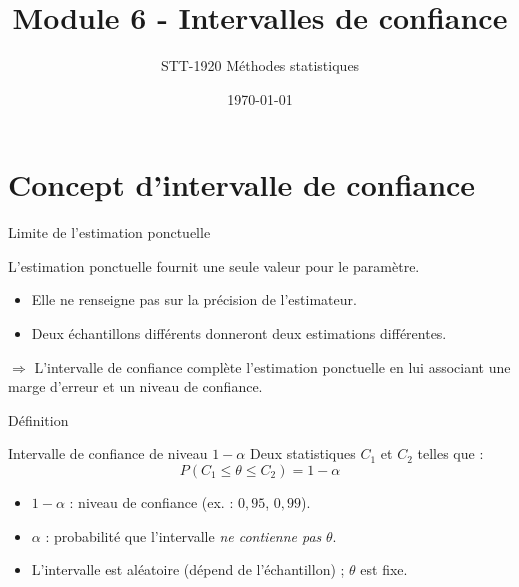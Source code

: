 \documentclass{BeamerTemplate}
\title{Module 6 - Intervalles de confiance}
\subtitle{STT-1920 Méthodes statistiques}
\date{\today}
\begin{document}
\begin{frame}[t]
  \titlepage
\end{frame}

\section{Concept d'intervalle de confiance}

\begin{frame}[t]{Limite de l'estimation ponctuelle}

L'estimation ponctuelle fournit \alert{une seule valeur} pour le paramètre.

\bigskip
\begin{itemize}\itemsep5mm
  \item Elle ne renseigne pas sur la \alert{précision} de l'estimateur.
  \item Deux échantillons différents donneront deux estimations différentes.
\end{itemize}

\bigskip
$\Rightarrow$ L'intervalle de confiance complète l'estimation ponctuelle en lui associant une \alert{marge d'erreur} et un \alert{niveau de confiance}.

\end{frame}

\begin{frame}[t]{Définition}

\begin{Boite}{Intervalle de confiance de niveau $1-\alpha$}
Deux statistiques $C_1$ et $C_2$ telles que :
$$P(C_1 \le \theta \le C_2) = 1 - \alpha$$
\end{Boite}

\medskip
\begin{itemize}\itemsep5mm
  \item $1-\alpha$ : \alert{niveau de confiance} (ex. : $0{,}95$, $0{,}99$).
  \item $\alpha$ : probabilité que l'intervalle \emph{ne contienne pas} $\theta$.
  \item L'intervalle est \alert{aléatoire} (dépend de l'échantillon) ; $\theta$ est fixe.
\end{itemize}

\end{frame}
\end{document}
